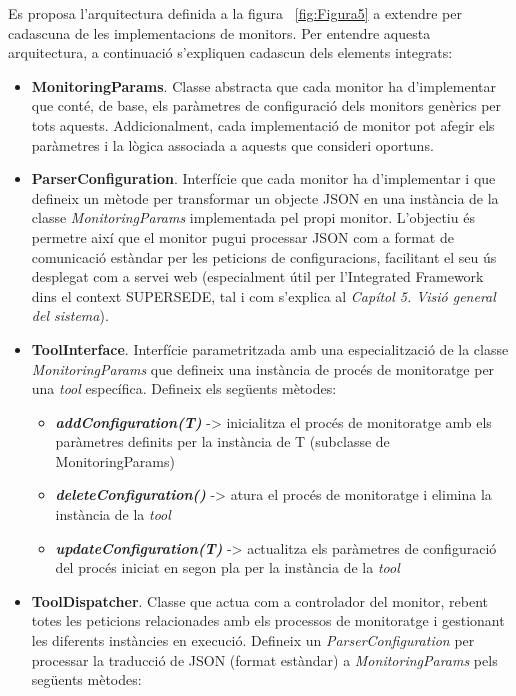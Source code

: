 Es proposa l'arquitectura definida a la figura ~\ref{fig:Figura5} a extendre per cadascuna de les implementacions de monitors. Per entendre aquesta arquitectura, a continuació s'expliquen cadascun dels elements integrats:

\begin{itemize}
\item \textbf{MonitoringParams}. Classe abstracta que cada monitor ha d'implementar que conté, de base, els paràmetres de configuració dels monitors genèrics per tots aquests. Addicionalment, cada implementació de monitor pot afegir els paràmetres i la lògica associada a aquests que consideri oportuns.
\item \textbf{ParserConfiguration}. Interfície que cada monitor ha d'implementar i que defineix un mètode per transformar un objecte JSON en una instància de la classe \textit{MonitoringParams} implementada pel propi monitor. L'objectiu és permetre així que el monitor pugui processar JSON com a format de comunicació estàndar per les peticions de configuracions, facilitant el seu ús desplegat com a servei web (especialment útil per l'Integrated Framework dins el context SUPERSEDE, tal i com s'explica al \textit{Capítol 5. Visió general del sistema}).
\item \textbf{ToolInterface}. Interfície parametritzada amb una especialització de la classe \textit{MonitoringParams} que defineix una instància de procés de monitoratge per una \textit{tool} específica. Defineix els següents mètodes:
\begin{itemize}
\item \textbf{\textit{addConfiguration(T)}} -> inicialitza el procés de monitoratge amb els paràmetres definits per la instància de T (subclasse de MonitoringParams)
\item \textbf{\textit{deleteConfiguration()}} -> atura el procés de monitoratge i elimina la instància de la \textit{tool}
\item \textbf{\textit{updateConfiguration(T)}} -> actualitza els paràmetres de configuració del procés iniciat en segon pla per la instància de la \textit{tool}
\end{itemize}
\item \textbf{ToolDispatcher}. Classe que actua com a controlador del monitor, rebent totes les peticions relacionades amb els processos de monitoratge i gestionant les diferents instàncies en execució. Defineix un \textit{ParserConfiguration} per processar la traducció de JSON (format estàndar) a \textit{MonitoringParams} pels següents mètodes:

\end{itemize}
